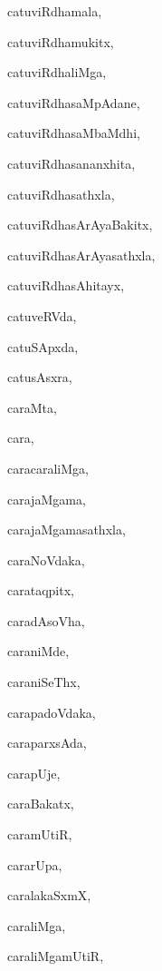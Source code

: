 \begin{multicols}{2}
{catuviRdhamala}, \pageref{catuviRdhamala}

{catuviRdhamukitx}, \pageref{catuviRdhamukitx}

{catuviRdhaliMga}, \pageref{catuviRdhaliMga}

{catuviRdhasaMpAdane}, \pageref{catuviRdhasaMpAdane}

{catuviRdhasaMbaMdhi}, \pageref{catuviRdhasaMbaMdhi}

{catuviRdhasananxhita}, \pageref{catuviRdhasananxhita}

{catuviRdhasathxla}, \pageref{catuviRdhasathxla}

{catuviRdhasArAyaBakitx}, \pageref{catuviRdhasArAyaBakitx}

{catuviRdhasArAyasathxla}, \pageref{catuviRdhasArAyasathxla}

{catuviRdhasAhitayx}, \pageref{catuviRdhasAhitayx}

{catuveRVda}, \pageref{catuveRVda}

{catuSApxda}, \pageref{catuSApxda}

{catusAsxra}, \pageref{catusAsxra}

{caraMta}, \pageref{caraMta}

{cara}, \pageref{cara}

{caracaraliMga}, \pageref{caracaraliMga}

{carajaMgama}, \pageref{carajaMgama}

{carajaMgamasathxla}, \pageref{carajaMgamasathxla}

{caraNoVdaka}, \pageref{caraNoVdaka}

{carataqpitx}, \pageref{carataqpitx}

{caradAsoVha}, \pageref{caradAsoVha}

{caraniMde}, \pageref{caraniMde}

{caraniSeThx}, \pageref{caraniSeThx}

{carapadoVdaka}, \pageref{carapadoVdaka}

{caraparxsAda}, \pageref{caraparxsAda}

{carapUje}, \pageref{carapUje}

{caraBakatx}, \pageref{caraBakatx}

{caramUtiR}, \pageref{caramUtiR}

{cararUpa}, \pageref{cararUpa}

{caralakaSxmX}, \pageref{caralakaSxmX}

{caraliMga}, \pageref{caraliMga}

{caraliMgamUtiR}, \pageref{caraliMgamUtiR}


\end{multicols}
